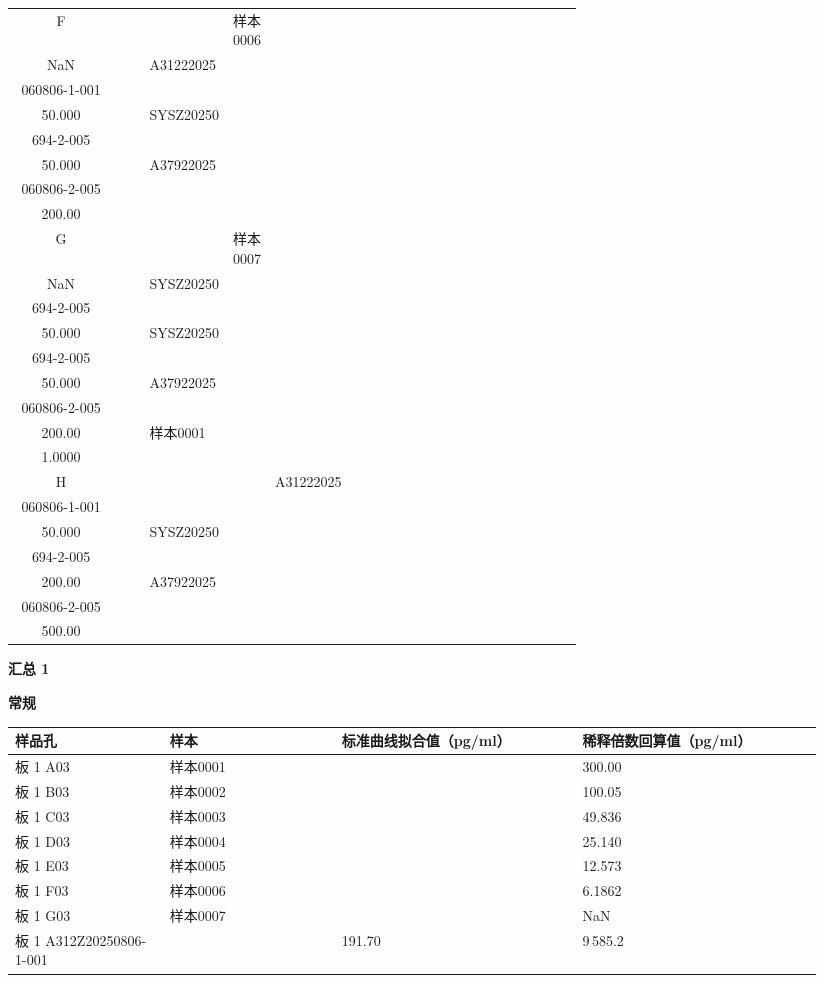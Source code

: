 \documentclass[UTF8,10pt,a4paper,fontset=fandol]{ctexart}
\begin{document}
\begin{center}
\begin{tabular}{c|*{12}{p{0.055\linewidth}|}}
F&&&样本0006\\NaN&&
A31222025\\060806-1-001\\50.000&&
SYSZ20250\\694-2-005\\50.000&&
A37922025\\060806-2-005\\200.00&&&&\\ \hline
G&&&样本0007\\NaN&&
SYSZ20250\\694-2-005\\50.000&&
SYSZ20250\\694-2-005\\50.000&&
A37922025\\060806-2-005\\200.00&&
样本0001\\1.0000&&\\ \hline
H&&&&
A31222025\\060806-1-001\\50.000&&
SYSZ20250\\694-2-005\\200.00&&
A37922025\\060806-2-005\\500.00&&&&&
\end{tabular}
\end{center}

\medskip
\noindent\textbf{汇总 1}

\medskip
\noindent\textbf{常规}

\begin{center}
\scriptsize
\begin{tabular}{p{0.18\linewidth}p{0.20\linewidth}p{0.28\linewidth}p{0.28\linewidth}}
样品孔 & 样本 & 标准曲线拟合值（pg/ml） & 稀释倍数回算值（pg/ml）\\ \hline
板 1 A03 & 样本0001 & & 300.00\\
板 1 B03 & 样本0002 & & 100.05\\
板 1 C03 & 样本0003 & & 49.836\\
板 1 D03 & 样本0004 & & 25.140\\
板 1 E03 & 样本0005 & & 12.573\\
板 1 F03 & 样本0006 & & 6.1862\\
板 1 G03 & 样本0007 & & NaN\\
板 1 A312Z20250806-1-001 & & 191.70 & 9\,585.2
\end{tabular}
\end{center}
\end{document}
